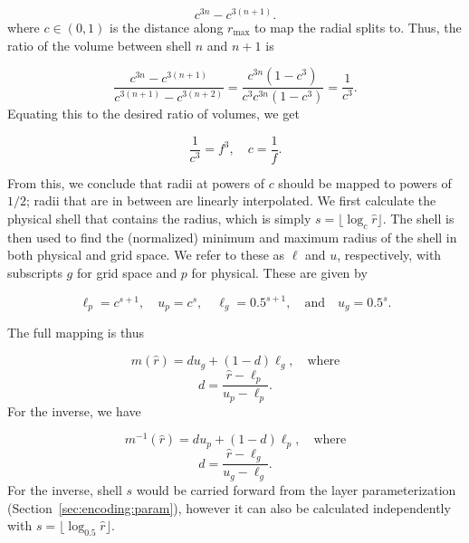 \begin{equation*}
c^{3n} - c^{3 \left( n + 1 \right)}.
\end{equation*}%
%
where $c \in (0, 1)$ is the distance along $r_\mathrm{max}$ to map the radial splits to.
Thus, the ratio of the volume between shell $n$ and $n+1$ is

\begin{equation*}
\frac{ c^{3n} - c^{3 \left( n + 1 \right)} }{ c^{3 \left(n + 1 \right)} - c^{3\left( n + 2 \right)} } = \frac{ c^{3n} \left( 1 - c^{3} \right) }{ c^{3} c^{3n} \left( 1 - c^{3} \right) } = \frac{1}{c^{3}}.
\end{equation*}%
%
Equating this to the desired ratio of volumes, we get

\begin{equation*}
\frac{1}{c^3} = {f^3}, \quad c = \frac{1}{f}.
\end{equation*}

From this, we conclude that radii at powers of $c$ should be mapped to powers of $1/2$; radii that are in between are linearly interpolated.
We first calculate the physical shell that contains the radius, which is simply $s = \lfloor \log_c \hat{r} \rfloor$.
The shell is then used to find the (normalized) minimum and maximum radius of the shell in both physical and grid space.
We refer to these as $\ell$ and $u$, respectively, with subscripts $g$ for grid space and $p$ for physical.
These are given by

\begin{equation*}
\ell_p = c^{s+1}, \quad u_p = c^s, \quad \ell_g = 0.5^{s+1}, \quad \text{and} \quad u_g = 0.5^s.
\end{equation*}

The full mapping is thus

\begin{equation*}
m(\hat{r}) = du_g + (1-d)\ell_g, \quad \text{where}
\end{equation*}
%
\begin{equation*}
d = \frac{ \hat{r} - \ell_p}{u_p - \ell_p}.
\end{equation*}
%
For the inverse, we have

\begin{equation*}
m^{-1}(\hat{r}) = du_p + (1-d)\ell_p, \quad \text{where}
\end{equation*}
%
\begin{equation*}
d = \frac{ \hat{r} - \ell_g}{u_g - \ell_g}.
\end{equation*}
%
For the inverse, shell $s$ would be carried forward from the layer parameterization (Section~\ref{sec:encoding:param}), however it can also be calculated independently with $s = \lfloor \log_{0.5} \hat{r} \rfloor$.


